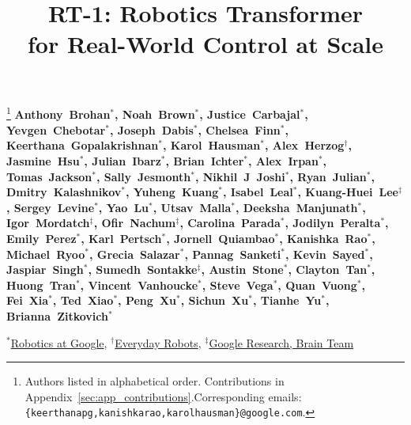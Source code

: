 \documentclass{article} %
\title{RT-1: Robotics Transformer \\for Real-World Control at Scale}
\begin{document}
\maketitle

\vspace{-2cm}
{
\begin{flushleft}
\footnote{Authors listed in alphabetical order. Contributions in Appendix~\ref{sec:app_contributions}.\newline Corresponding emails: \texttt{\{keerthanapg,kanishkarao,karolhausman\}@google.com}.}
\bf\small\mbox{Anthony Brohan$^*$}, \mbox{Noah Brown$^*$},  \mbox{Justice Carbajal$^*$}, \mbox{Yevgen Chebotar$^*$}, \mbox{Joseph Dabis$^*$}, \mbox{Chelsea Finn$^*$}, \mbox{Keerthana Gopalakrishnan$^*$}, \mbox{Karol Hausman$^*$}, \mbox{Alex Herzog$^\dag$}, \mbox{Jasmine Hsu$^*$}, \mbox{Julian Ibarz$^*$},
\mbox{Brian Ichter$^*$}, \mbox{Alex Irpan$^*$}, \mbox{Tomas Jackson$^*$}, 
\mbox{Sally Jesmonth$^*$}, \mbox{Nikhil J Joshi$^*$}, \mbox{Ryan Julian$^*$}, \mbox{Dmitry Kalashnikov$^*$}, \mbox{Yuheng Kuang$^*$}, \mbox{Isabel Leal$^*$}, \mbox{Kuang-Huei Lee$^\ddag$},
\mbox{Sergey Levine$^*$}, \mbox{Yao Lu$^*$}, \mbox{Utsav Malla$^*$}, \mbox{Deeksha Manjunath$^*$}, \mbox{Igor Mordatch$^\ddag$},  \mbox{Ofir Nachum$^\ddag$}, \mbox{Carolina Parada$^*$}, \mbox{Jodilyn Peralta$^*$}, \mbox{Emily Perez$^*$}, \mbox{Karl Pertsch$^*$}, \mbox{Jornell Quiambao$^*$},
\mbox{Kanishka Rao$^*$}, \mbox{Michael Ryoo$^*$}, \mbox{Grecia Salazar$^*$}, \mbox{Pannag Sanketi$^*$}, \mbox{Kevin Sayed$^*$}, \mbox{Jaspiar Singh$^*$}, \mbox{Sumedh Sontakke$^\ddag$}, \mbox{Austin Stone$^*$}, \mbox{Clayton Tan$^*$},
\mbox{Huong Tran$^*$}, \mbox{Vincent Vanhoucke$^*$}, \mbox{Steve Vega$^*$}, \mbox{Quan Vuong$^*$}, \mbox{Fei Xia$^*$}, \mbox{Ted Xiao$^*$}, \mbox{Peng Xu$^*$}, \mbox{Sichun Xu$^*$}, \mbox{Tianhe Yu$^*$}, \mbox{Brianna Zitkovich$^*$} 
\end{flushleft}
\vspace{-0.25cm}
$^*$\href{http://g.co/robotics}{Robotics at Google}, $^\dag$\href{https://everydayrobots.com/}{Everyday Robots},
$^\ddag$\href{https://research.google/teams/brain/}{Google Research, Brain Team}
}
\end{document}
